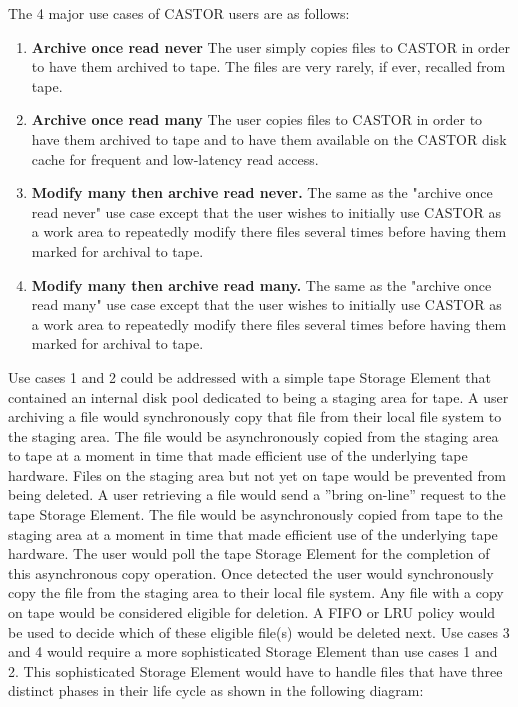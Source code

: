 \documentclass{article}
\begin{document}
The 4 major use cases of CASTOR users are as follows:
\begin{enumerate}
  	\item \textbf{Archive once read never}
  	\newline The user simply copies files to CASTOR in order to have them archived to tape.  The files are very rarely, if ever, recalled from tape.
  	\item \textbf{Archive once read many}
  	\newline The user copies files to CASTOR in order to have them archived to tape and to have them available on the CASTOR disk cache for frequent and low-latency read access.
  	\item \textbf{Modify many then archive read never.}
  	\newline The same as the "archive once read never" use case except that the user wishes to initially use CASTOR as a work area to repeatedly modify there files several times before having them marked for archival to tape.
  	\item \textbf{Modify many then archive read many.}
  	\newline The same as the "archive once read many" use case except that the user wishes to initially use CASTOR as a work area to repeatedly modify there files several times before having them marked for archival to tape.
  \end{enumerate}
  Use cases 1 and 2 could be addressed with a simple tape Storage Element that contained an internal disk pool dedicated to being a staging area for tape.  A user archiving a file would synchronously copy that file from their local file system to the staging area.  The file would be asynchronously copied from the staging area to tape at a moment in time that made efficient use of the underlying tape hardware.  Files on the staging area but not yet on tape would be prevented from being deleted.  A user retrieving a file would send a ''bring on-line'' request to the tape Storage Element.  The file would be asynchronously copied from tape to the staging area at a moment in time that made efficient use of the underlying tape hardware.   The user would poll the tape Storage Element for the completion of this asynchronous copy operation.  Once detected the user would synchronously copy the file from the staging area to their local file system.  Any file with a copy on tape would be considered eligible for deletion.  A FIFO or LRU policy would be used to decide which of these eligible file(s) would be deleted next.
  \newpage
  Use cases 3 and 4 would require a more sophisticated Storage Element than use cases 1 and 2.  This sophisticated Storage Element would have to handle files that have three distinct phases in their life cycle as shown in the following diagram:
  
\end{document}
